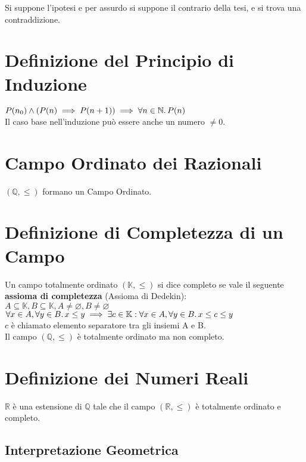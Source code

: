 \documentclass[a4paper, twoside, italian, 11pt]{book}
\newcommand{\N}{\mathbb{N}}
\newcommand{\Q}{\mathbb{Q}}
\newcommand{\K}{\mathbb{K}}
\newcommand{\R}{\mathbb{R}}
\let\emptyset\varnothing
\begin{document}
\noindent
Si suppone l'ipotesi e per assurdo si suppone il contrario della tesi, e si trova una contraddizione.



\section{Definizione del Principio di Induzione}

\indent
$P(n_0) \land (P(n) \implies P(n + 1)) \implies \forall n \in \N \ldotp P(n)$ \\

\noindent
Il caso base nell'induzione può essere anche un numero $\neq 0$.



\section{Campo Ordinato dei Razionali}
\noindent
$(\Q, \leq)$ formano un Campo Ordinato.


\section{Definizione di Completezza di un Campo}

\noindent
Un campo totalmente ordinato $(\K, \leq)$ si dice completo se vale il seguente \textbf{assioma di completezza} (Assioma di Dedekin): \\

$A \subseteq \K, B \subseteq \K, A \neq \emptyset, B \neq \emptyset$ \\

$\forall x \in A, \forall y \in B \ldotp x \leq y \implies \exists c \in \K : \forall x \in A, \forall y \in B \ldotp x \leq c \leq y$ \\

\noindent
$c$ è chiamato elemento separatore tra gli insiemi A e B. \\

\noindent
Il campo $(\Q, \leq)$ è totalmente ordinato ma non completo.


\section{Definizione dei Numeri Reali}

\noindent
$\R$ è una estensione di $\Q$ tale che il campo $(\R, \leq)$ è totalmente ordinato e completo.


\subsection{Interpretazione Geometrica}
\end{document}
